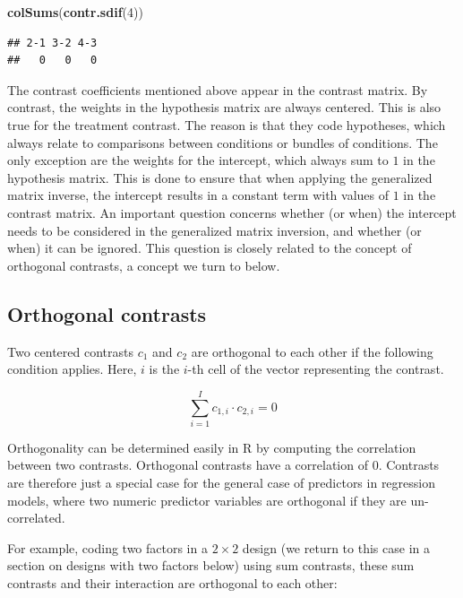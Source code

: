 \documentclass[12pt,]{krantz}
\newenvironment{Shaded}{\begin{snugshade}}{\end{snugshade}}
\newcommand{\KeywordTok}[1]{\textcolor[rgb]{0.13,0.29,0.53}{\textbf{#1}}}
\newcommand{\DecValTok}[1]{\textcolor[rgb]{0.00,0.00,0.81}{#1}}
\newcommand{\NormalTok}[1]{#1}
\theoremstyle{definition}
\theoremstyle{definition}
\theoremstyle{definition}
\theoremstyle{remark}
\begin{document}
\begin{Shaded}
\begin{Highlighting}[]
\KeywordTok{colSums}\NormalTok{(}\KeywordTok{contr.sdif}\NormalTok{(}\DecValTok{4}\NormalTok{))}
\end{Highlighting}
\end{Shaded}

\begin{verbatim}
## 2-1 3-2 4-3 
##   0   0   0
\end{verbatim}

The contrast coefficients mentioned above appear in the contrast matrix.
By contrast, the weights in the hypothesis matrix are always centered.
This is also true for the treatment contrast. The reason is that they
code hypotheses, which always relate to comparisons between conditions
or bundles of conditions. The only exception are the weights for the
intercept, which always sum to \(1\) in the hypothesis matrix. This is
done to ensure that when applying the generalized matrix inverse, the
intercept results in a constant term with values of \(1\) in the
contrast matrix. An important question concerns whether (or when) the
intercept needs to be considered in the generalized matrix inversion,
and whether (or when) it can be ignored. This question is closely
related to the concept of orthogonal contrasts, a concept we turn to
below.

\subsection{Orthogonal contrasts}\label{orthogonal-contrasts}

Two centered contrasts \(c_1\) and \(c_2\) are orthogonal to each other
if the following condition applies. Here, \(i\) is the \(i\)-th cell of
the vector representing the contrast.

\begin{equation}
\sum_{i=1}^I c_{1,i} \cdot c_{2,i} = 0
\end{equation}

Orthogonality can be determined easily in R by computing the correlation
between two contrasts. Orthogonal contrasts have a correlation of \(0\).
Contrasts are therefore just a special case for the general case of
predictors in regression models, where two numeric predictor variables
are orthogonal if they are un-correlated.

For example, coding two factors in a \(2 \times 2\) design (we return to
this case in a section on designs with two factors below) using sum
contrasts, these sum contrasts and their interaction are orthogonal to
each other:
\end{document}
